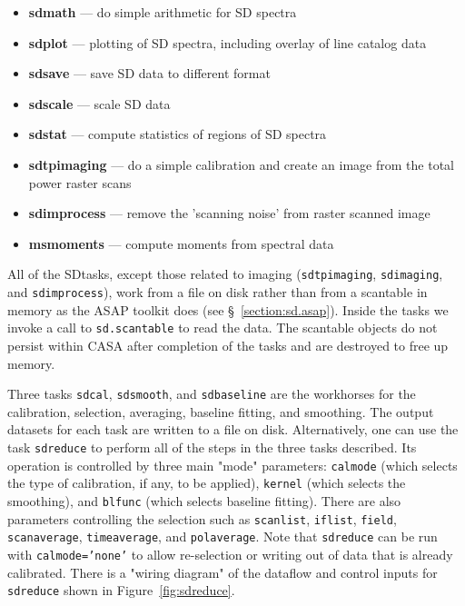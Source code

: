 \begin{itemize}
\item {\bf sdmath} --- do simple arithmetic for SD spectra 

\item {\bf sdplot} --- plotting of SD spectra, including overlay of line
catalog data

\item {\bf sdsave} --- save SD data to different format

\item {\bf sdscale} --- scale SD data
 
\item {\bf sdstat} --- compute statistics of regions of SD spectra

\item {\bf sdtpimaging} --- do a simple calibration and create an image from the total power raster scans

\item {\bf sdimprocess} --- remove the 'scanning noise' from raster scanned image  

\item {\bf msmoments} --- compute moments from spectral data

\end{itemize}

All of the SDtasks, except  those related to imaging  ({\tt sdtpimaging}, {\tt sdimaging}, and {\tt sdimprocess}), 
work from a file on disk rather than from
a scantable in memory as the ASAP toolkit does (see 
\S~\ref{section:sd.asap}).  Inside the tasks we invoke a call
to {\tt sd.scantable} to read the data.  The scantable objects
do not persist within CASA after completion of the tasks and
are destroyed to free up memory. 

Three tasks {\tt sdcal}, {\tt sdsmooth}, and {\tt sdbaseline} are the
workhorses for the calibration, selection,
averaging, baseline fitting, and smoothing. The output datasets for
each task are written to a file on disk.
Alternatively, one can use the task {\tt sdreduce} to perform all of the steps in
the three tasks described. 
Its operation is
controlled by three main "mode" parameters: {\tt calmode} (which selects
the type of calibration, if any, to be applied), {\tt kernel} (which selects
the smoothing), and {\tt blfunc} (which selects baseline fitting).  There
are also parameters controlling the selection such as {\tt scanlist}, 
{\tt iflist}, {\tt field}, {\tt scanaverage}, {\tt timeaverage}, and
{\tt polaverage}.  Note that {\tt sdreduce} can be
run with {\tt calmode='none'} to allow re-selection or writing out of data
that is already calibrated.  There is a "wiring diagram" of the dataflow and control inputs for
{\tt sdreduce} shown in Figure~\ref{fig:sdreduce}.

